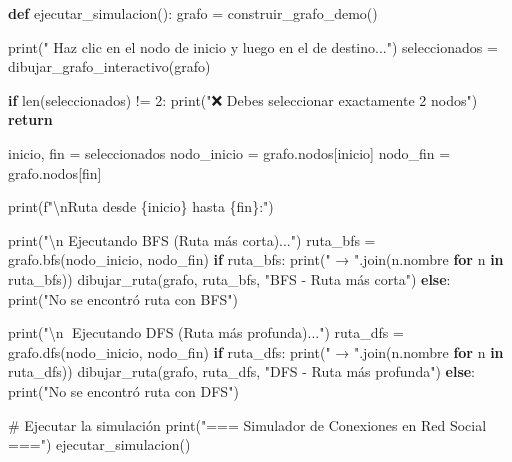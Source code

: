 \documentclass[
  spanish,
  letterpaper,
  DIV=11,
  numbers=noendperiod]{scrartcl}
\newenvironment{Shaded}{\begin{snugshade}}{\end{snugshade}}
\newcommand{\BuiltInTok}[1]{\textcolor[rgb]{0.00,0.23,0.31}{#1}}
\newcommand{\CharTok}[1]{\textcolor[rgb]{0.13,0.47,0.30}{#1}}
\newcommand{\CommentTok}[1]{\textcolor[rgb]{0.37,0.37,0.37}{#1}}
\newcommand{\ControlFlowTok}[1]{\textcolor[rgb]{0.00,0.23,0.31}{\textbf{#1}}}
\newcommand{\DecValTok}[1]{\textcolor[rgb]{0.68,0.00,0.00}{#1}}
\newcommand{\KeywordTok}[1]{\textcolor[rgb]{0.00,0.23,0.31}{\textbf{#1}}}
\newcommand{\NormalTok}[1]{\textcolor[rgb]{0.00,0.23,0.31}{#1}}
\newcommand{\OperatorTok}[1]{\textcolor[rgb]{0.37,0.37,0.37}{#1}}
\newcommand{\SpecialCharTok}[1]{\textcolor[rgb]{0.37,0.37,0.37}{#1}}
\newcommand{\SpecialStringTok}[1]{\textcolor[rgb]{0.13,0.47,0.30}{#1}}
\newcommand{\StringTok}[1]{\textcolor[rgb]{0.13,0.47,0.30}{#1}}
\begin{document}
\begin{Shaded}
\begin{Highlighting}[]
\KeywordTok{def}\NormalTok{ ejecutar\_simulacion():}
\NormalTok{    grafo }\OperatorTok{=}\NormalTok{ construir\_grafo\_demo()}
    
    \BuiltInTok{print}\NormalTok{(}\StringTok{" Haz clic en el nodo de inicio y luego en el de destino..."}\NormalTok{)}
\NormalTok{    seleccionados }\OperatorTok{=}\NormalTok{ dibujar\_grafo\_interactivo(grafo)}
    
    \ControlFlowTok{if} \BuiltInTok{len}\NormalTok{(seleccionados) }\OperatorTok{!=} \DecValTok{2}\NormalTok{:}
        \BuiltInTok{print}\NormalTok{(}\StringTok{"❌ Debes seleccionar exactamente 2 nodos"}\NormalTok{)}
        \ControlFlowTok{return}
    
\NormalTok{    inicio, fin }\OperatorTok{=}\NormalTok{ seleccionados}
\NormalTok{    nodo\_inicio }\OperatorTok{=}\NormalTok{ grafo.nodos[inicio]}
\NormalTok{    nodo\_fin }\OperatorTok{=}\NormalTok{ grafo.nodos[fin]}
    
    \BuiltInTok{print}\NormalTok{(}\SpecialStringTok{f"}\CharTok{\textbackslash{}n}\SpecialStringTok{Ruta desde }\SpecialCharTok{\{}\NormalTok{inicio}\SpecialCharTok{\}}\SpecialStringTok{ hasta }\SpecialCharTok{\{}\NormalTok{fin}\SpecialCharTok{\}}\SpecialStringTok{:"}\NormalTok{)}
    
    \BuiltInTok{print}\NormalTok{(}\StringTok{"}\CharTok{\textbackslash{}n}\StringTok{ Ejecutando BFS (Ruta más corta)..."}\NormalTok{)}
\NormalTok{    ruta\_bfs }\OperatorTok{=}\NormalTok{ grafo.bfs(nodo\_inicio, nodo\_fin)}
    \ControlFlowTok{if}\NormalTok{ ruta\_bfs:}
        \BuiltInTok{print}\NormalTok{(}\StringTok{" → "}\NormalTok{.join(n.nombre }\ControlFlowTok{for}\NormalTok{ n }\KeywordTok{in}\NormalTok{ ruta\_bfs))}
\NormalTok{        dibujar\_ruta(grafo, ruta\_bfs, }\StringTok{"BFS {-} Ruta más corta"}\NormalTok{)}
    \ControlFlowTok{else}\NormalTok{:}
        \BuiltInTok{print}\NormalTok{(}\StringTok{"No se encontró ruta con BFS"}\NormalTok{)}
    
    \BuiltInTok{print}\NormalTok{(}\StringTok{"}\CharTok{\textbackslash{}n}\StringTok{🔶 Ejecutando DFS (Ruta más profunda)..."}\NormalTok{)}
\NormalTok{    ruta\_dfs }\OperatorTok{=}\NormalTok{ grafo.dfs(nodo\_inicio, nodo\_fin)}
    \ControlFlowTok{if}\NormalTok{ ruta\_dfs:}
        \BuiltInTok{print}\NormalTok{(}\StringTok{" → "}\NormalTok{.join(n.nombre }\ControlFlowTok{for}\NormalTok{ n }\KeywordTok{in}\NormalTok{ ruta\_dfs))}
\NormalTok{        dibujar\_ruta(grafo, ruta\_dfs, }\StringTok{"DFS {-} Ruta más profunda"}\NormalTok{)}
    \ControlFlowTok{else}\NormalTok{:}
        \BuiltInTok{print}\NormalTok{(}\StringTok{"No se encontró ruta con DFS"}\NormalTok{)}

\CommentTok{\# Ejecutar la simulación}
\BuiltInTok{print}\NormalTok{(}\StringTok{"=== Simulador de Conexiones en Red Social ==="}\NormalTok{)}
\NormalTok{ejecutar\_simulacion()}
\end{Highlighting}
\end{Shaded}
\end{document}
